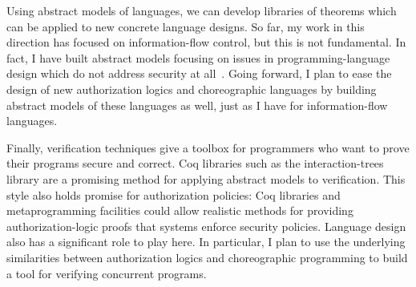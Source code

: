 \documentclass{article}
\theoremstyle{definition}
\begin{document}
Using abstract models of languages, we can develop libraries of theorems which can be applied to new concrete language designs.
So far, my work in this direction has focused on information-flow control, but this is not fundamental.
In fact, I have built abstract models focusing on issues in programming-language design which do not address security at all~\citep{HirschT18}.
Going forward, I plan to ease the design of new authorization logics and choreographic languages by building abstract models of these languages as well, just as I have for information-flow languages.

Finally, verification techniques give a toolbox for programmers who want to prove their programs secure and correct.
Coq libraries such as the interaction-trees library are a promising method for applying abstract models to verification.
This style also holds promise for authorization policies: Coq libraries and metaprogramming facilities could allow realistic methods for providing authorization-logic proofs that systems enforce security policies.
Language design also has a significant role to play here.
In particular, I plan to use the underlying similarities between authorization logics and choreographic programming to build a tool for verifying concurrent programs.


\end{document}
